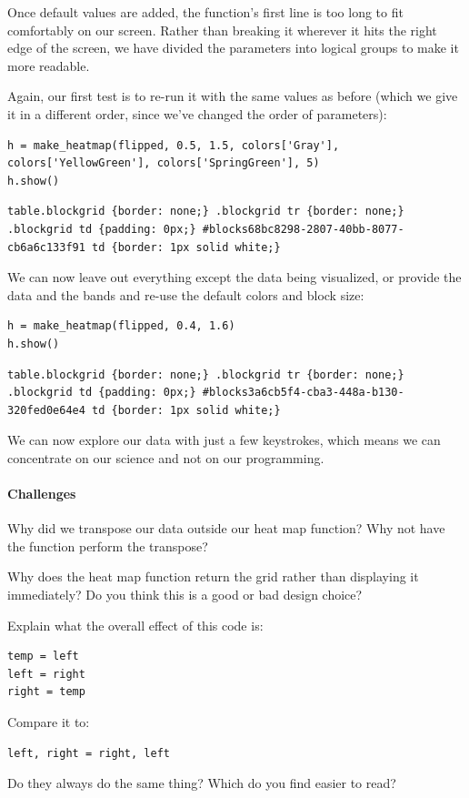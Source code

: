 \documentclass{book}
\begin{document}
Once default values are added, the function's first line is too long to
fit comfortably on our screen. Rather than breaking it wherever it hits
the right edge of the screen, we have divided the parameters into
logical groups to make it more readable.

Again, our first test is to re-run it with the same values as before
(which we give it in a different order, since we've changed the order of
parameters):

\begin{verbatim}
h = make_heatmap(flipped, 0.5, 1.5, colors['Gray'], colors['YellowGreen'], colors['SpringGreen'], 5)
h.show()
\end{verbatim}

\begin{verbatim}
table.blockgrid {border: none;} .blockgrid tr {border: none;} .blockgrid td {padding: 0px;} #blocks68bc8298-2807-40bb-8077-cb6a6c133f91 td {border: 1px solid white;}
\end{verbatim}

We can now leave out everything except the data being visualized, or
provide the data and the bands and re-use the default colors and block
size:

\begin{verbatim}
h = make_heatmap(flipped, 0.4, 1.6)
h.show()
\end{verbatim}

\begin{verbatim}
table.blockgrid {border: none;} .blockgrid tr {border: none;} .blockgrid td {padding: 0px;} #blocks3a6cb5f4-cba3-448a-b130-320fed0e64e4 td {border: 1px solid white;}
\end{verbatim}

We can now explore our data with just a few keystrokes, which means we
can concentrate on our science and not on our programming.

\mbox{}\paragraph{Challenges}

\begin{swcenumerate}
\item
  Why did we transpose our data outside our heat map function? Why not
  have the function perform the transpose?
\item
  Why does the heat map function return the grid rather than displaying
  it immediately? Do you think this is a good or bad design choice?
\item
  Explain what the overall effect of this code is:
\begin{verbatim}
temp = left
left = right
right = temp
\end{verbatim}
Compare it to:
\begin{verbatim}
left, right = right, left
\end{verbatim}
  Do they always do the same thing?
  Which do you find easier to read?
\end{swcenumerate}
\end{document}
